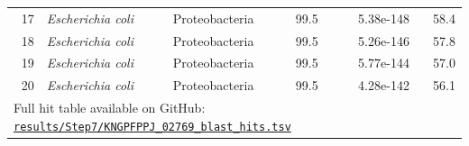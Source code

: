 \documentclass[review,11pt]{article}
\begin{document}
\begin{table}[H]
{\begin{tabular}{rlllrr}
17 & \textit{Escherichia coli}    & Proteobacteria & 99.5  & 5.38e-148 & 58.4 \\
18 & \textit{Escherichia coli}    & Proteobacteria & 99.5  & 5.26e-146 & 57.8 \\
19 & \textit{Escherichia coli}    & Proteobacteria & 99.5  & 5.77e-144 & 57.0 \\
20 & \textit{Escherichia coli}    & Proteobacteria & 99.5  & 4.28e-142 & 56.1 \\
\bottomrule
\multicolumn{6}{l}{\footnotesize Full hit table available on GitHub: \href{https://github.com/hosniadilemp-a11y/AMR_Novel_Gene_Discovery/blob/main/results/Step7/KNGPFPPJ_02769_blast_hits.tsv}{\texttt{results/Step7/KNGPFPPJ\_02769\_blast\_hits.tsv}}} \\
\end{tabular}%
}
\end{table}
\end{document}
